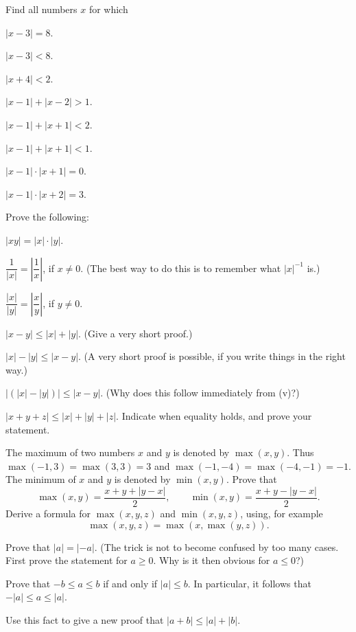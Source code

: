  Find all numbers $x$ for which
\begin{romans}
\item $|x-3| = 8$.
\item $|x-3| < 8$.
\item $|x+4| < 2$.
\item $|x-1| + |x-2| > 1$.
\item $|x-1| + |x+1| < 2$.
\item $|x-1| + |x+1| < 1$.
\item $|x-1| \cdot |x+1| = 0$.
\item $|x-1| \cdot |x+2| = 3$.
\end{romans}

 Prove the following:
\begin{romans}
\item $|xy| = |x| \cdot |y|$.
\item $\dfrac{1}{|x|} = \left|\dfrac{1}{x}\right|$, if $x \neq 0$. (The best
  way to do this is to remember what $|x|^{-1}$ is.)
\item $\dfrac{|x|}{|y|} = \left|\dfrac{x}{y}\right|$, if $y \neq 0$.
\item $|x-y| \leq |x| + |y|$. (Give a very short proof.)
\item $|x| - |y| \leq |x-y|$. (A very short proof is possible, if you write
  things in the right way.)
\item $|(|x|-|y|)| \leq |x-y|$. (Why does this follow immediately from (v)?)
\item $|x+y+z| \leq |x|+|y|+|z|$. Indicate when equality holds, and prove
  your statement.
\end{romans}

 The maximum of two numbers $x$ and $y$ is denoted by $\max(x,y)$.
Thus $\max(-1,3) = \max(3,3) = 3$ and $\max(-1,-4) = \max(-4,-1) = -1$. The
minimum of $x$ and $y$ is denoted by $\min(x,y)$. Prove that
\[
\max(x,y) = \frac{x + y + |y-x|}{2},
\qquad
\min(x,y) = \frac{x + y - |y-x|}{2}.
\]
Derive a formula for $\max(x,y,z)$ and $\min(x,y,z)$, using, for example
\[ \max(x,y,z) = \max(x,\max(y,z)). \]

\begin{letters}
\item Prove that $|a| = |-a|$. (The trick is not to become confused by too
  many cases. First prove the statement for $a \geq 0$. Why is it then obvious
  for $a \leq 0$?)
\item Prove that $-b \leq a \leq b$ if and only if $|a| \leq b$. In
  particular, it follows that $-|a| \leq a \leq |a|$.
\item Use this fact to give a new proof that $|a+b| \leq |a|+|b|$.
\end{letters}

